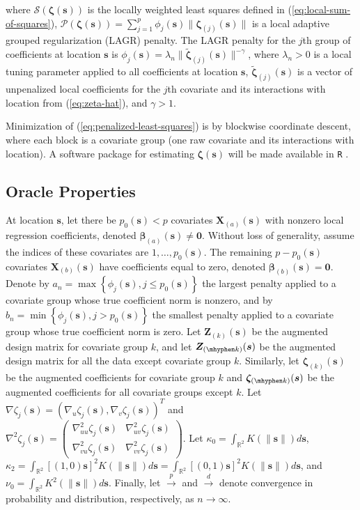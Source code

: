 \documentclass[authoryear,review, 12pt]{elsarticle}
\begin{document}
where $\mathcal{S}\left(\bm{\zeta}\left(\bm{s}\right)\right)$ is
the locally weighted least squares defined in (\ref{eq:local-sum-of-squares}),
$\mathcal{P}\left(\bm{\zeta}(\bm{s})\right)=\sum_{j=1}^{p}\phi_{j}(\bm{s})\|\bm{\zeta}_{(j)}(\bm{s})\|$
is a local adaptive grouped regularization (LAGR) penalty. The LAGR
penalty for the $j$th group of coefficients at location $\bm{s}$
is $\phi_{j}(\bm{s})=\lambda_{n}\|\tilde{\bm{\zeta}}_{(j)}(\bm{s})\|^{-\gamma}$,
where $\lambda_{n}>0$ is a local tuning parameter applied to all
coefficients at location $\bm{s}$, $\tilde{\bm{\zeta}}_{(j)}(\bm{s})$
is a vector of unpenalized local coefficients for the $j$th covariate
and its interactions with location from (\ref{eq:zeta-hat}), and $\gamma>1$.

Minimization of (\ref{eq:penalized-least-squares}) is by blockwise
coordinate descent, where each block is a covariate group (one raw
covariate and its interactions with location). A software package for estimating
$\bm{\zeta}(\bm{s})$ will be made available in \texttt{R} \citep{R-Core-2014}.

\subsection{Oracle Properties\label{sub:oracle-properties}}

At location $\bm{s}$, let there be $p_{0}(\bm{s})<p$ covariates $\bm{X}_{(a)}(\bm{s})$
with nonzero local regression coefficients, denoted $\bm{\beta}_{(a)}(\bm{s})\ne\bm{0}$.
Without loss of generality, assume the indices of these covariates
are $1,\dots,p_{0}(\bm{s})$. The remaining $p-p_{0}(\bm{s})$ covariates $\bm{X}_{(b)}(\bm{s})$
have coefficients equal to zero, denoted $\bm{\beta}_{(b)}(\bm{s})=\bm{0}$.
Denote by $a_{n}=\max\left\{ \phi_{j}(\bm{s}),j\le p_{0}(\bm{s})\right\} $
the largest penalty applied to a covariate group whose true coefficient
norm is nonzero, and by $b_{n}=\min\left\{ \phi_{j}(\bm{s}),j>p_{0}(\bm{s})\right\} $
the smallest penalty applied to a covariate group whose true coefficient
norm is zero. Let $\bm{Z}_{(k)}(\bm{s})$ be the augmented design
matrix for covariate group $k$, and let $\bm{Z}_{(\mhyphen k)}(\bm{s})$
be the augmented design matrix for all the data except covariate group
$k$. Similarly, let $\bm{\zeta}_{(k)}(\bm{s})$ be the augmented
coefficients for covariate group $k$ and $\bm{\zeta}_{(\mhyphen k)}(\bm{s})$
be the augmented coefficients for all covariate groups except $k$.
Let $\nabla\zeta_{j}(\bm{s})=\left(\nabla_{u}\zeta_{j}(\bm{s}),\nabla_{v}\zeta_{j}(\bm{s})\right)^{T}$
and $\nabla^{2}\zeta_{j}(\bm{s})=\left(\begin{array}{cc}
\nabla_{uu}^{2}\zeta_{j}(\bm{s}) & \nabla_{uv}^{2}\zeta_{j}(\bm{s})\\
\nabla_{vu}^{2}\zeta_{j}(\bm{s}) & \nabla_{vv}^{2}\zeta_{j}(\bm{s})
\end{array}\right)$. Let $\kappa_{0}=\int_{\mathbb{R}^{2}}K(\|\bm{s}\|)d\bm{s}$, $\kappa_{2}=\int_{\mathbb{R}^{2}}[(1,0)\bm{s}]^{2}K(\|\bm{s}\|)d\bm{s}=\int_{\mathbb{R}^{2}}[(0,1)\bm{s}]^{2}K(\|\bm{s}\|)d\bm{s}$,
and $\nu_{0}=\int_{\mathbb{R}^{2}}K^{2}(\|\bm{s}\|)d\bm{s}$. Finally,
let $\xrightarrow{p}$ and $\xrightarrow{d}$ denote convergence in
probability and distribution, respectively, as $n\to\infty$.
\end{document}
